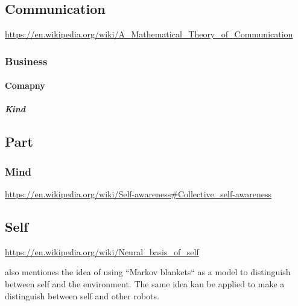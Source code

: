 \documentclass{book}
\begin{document}
\subsection{Communication}


\url{https://en.wikipedia.org/wiki/A_Mathematical_Theory_of_Communication}

\subsubsection{Business}

\paragraph{Comapny}

\subparagraph{Kind}


% 


% 

\subsection{Part}

\subsubsection{Mind}


\url{https://en.wikipedia.org/wiki/Self-awareness\#Collective_self-awareness}

\subsection{Self}


\url{https://en.wikipedia.org/wiki/Neural_basis_of_self}
    
    also \cite{friston-2013-life-as-we-know-it} mentiones the idea of using ``Markov blankets`` as a model to distinguish between self and the environment. The same idea kan be applied to make a distinguish between self and other robots.
\end{document}
